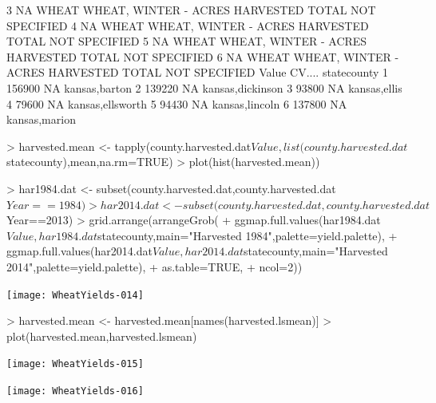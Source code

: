 \documentclass{report}
\begin{document}
\begin{Schunk}
\begin{Soutput}
3        NA     WHEAT WHEAT, WINTER - ACRES HARVESTED  TOTAL   NOT SPECIFIED
4        NA     WHEAT WHEAT, WINTER - ACRES HARVESTED  TOTAL   NOT SPECIFIED
5        NA     WHEAT WHEAT, WINTER - ACRES HARVESTED  TOTAL   NOT SPECIFIED
6        NA     WHEAT WHEAT, WINTER - ACRES HARVESTED  TOTAL   NOT SPECIFIED
   Value CV....      statecounty
1 156900     NA    kansas,barton
2 139220     NA kansas,dickinson
3  93800     NA     kansas,ellis
4  79600     NA kansas,ellsworth
5  94430     NA   kansas,lincoln
6 137800     NA    kansas,marion
\end{Soutput}
\begin{Sinput}
> harvested.mean <- tapply(county.harvested.dat$Value,list(county.harvested.dat$statecounty),mean,na.rm=TRUE)
> plot(hist(harvested.mean))
\end{Sinput}
\end{Schunk}

\begin{Schunk}
\begin{Sinput}
> har1984.dat <- subset(county.harvested.dat,county.harvested.dat$Year==1984)
> har2014.dat <- subset(county.harvested.dat,county.harvested.dat$Year==2013)
> grid.arrange(arrangeGrob(
+   ggmap.full.values(har1984.dat$Value,har1984.dat$statecounty,main="Harvested 1984",palette=yield.palette),
+   ggmap.full.values(har2014.dat$Value,har2014.dat$statecounty,main="Harvested 2014",palette=yield.palette),
+    as.table=TRUE,
+    ncol=2))
\end{Sinput}
\end{Schunk}
\texttt{[image: WheatYields-014]}
   
\begin{Schunk}
\begin{Sinput}
> harvested.mean <- harvested.mean[names(harvested.lsmean)]
> plot(harvested.mean,harvested.lsmean)
\end{Sinput}
\end{Schunk}
\texttt{[image: WheatYields-015]}

\begin{Schunk}
\end{Schunk}
\texttt{[image: WheatYields-016]}
\end{document}
